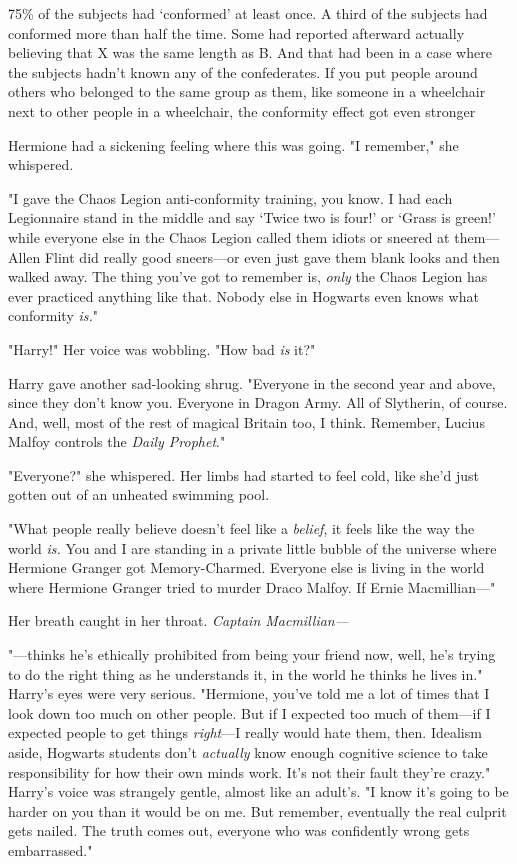 75\% of the subjects had `conformed' at least once. A third of the subjects had
conformed more than half the time. Some had reported afterward actually
believing that X was the same length as B. And that had been in a case where
the subjects hadn't known any of the confederates. If you put people around
others who belonged to the same group as them, like someone in a wheelchair
next to other people in a wheelchair, the conformity effect got even
stronger{\el}

Hermione had a sickening feeling where this was going. "I remember," she
whispered.

"I gave the Chaos Legion anti-conformity training, you know. I had each
Legionnaire stand in the middle and say `Twice two is four!' or `Grass is
green!' while everyone else in the Chaos Legion called them idiots or sneered
at them---Allen Flint did really good sneers---or even just gave them blank
looks and then walked away. The thing you've got to remember is, \emph{only}
the Chaos Legion has ever practiced anything like that. Nobody else in Hogwarts
even knows what conformity \emph{is.}"

"Harry!" Her voice was wobbling. "How bad \emph{is} it?"

Harry gave another sad-looking shrug. "Everyone in the second year and above,
since they don't know you. Everyone in Dragon Army. All of Slytherin, of
course. And, well, most of the rest of magical Britain too, I think. Remember,
Lucius Malfoy controls the \emph{Daily Prophet}."

"Everyone?" she whispered. Her limbs had started to feel cold, like she'd just
gotten out of an unheated swimming pool.

"What people really believe doesn't feel like a \emph{belief}, it feels like
the way the world \emph{is.} You and I are standing in a private little bubble
of the universe where Hermione Granger got Memory-Charmed. Everyone else is
living in the world where Hermione Granger tried to murder Draco Malfoy. If
Ernie Macmillian\mbox{---}"

Her breath caught in her throat. \emph{Captain Macmillian---}

"---thinks he's ethically prohibited from being your friend now, well, he's
trying to do the right thing as he understands it, in the world he thinks he
lives in." Harry's eyes were very serious. "Hermione, you've told me a lot of
times that I look down too much on other people. But if I expected too much of
them---if I expected people to get things \emph{right}---I really would hate
them, then. Idealism aside, Hogwarts students don't \emph{actually} know enough
cognitive science to take responsibility for how their own minds work. It's not
their fault they're crazy." Harry's voice was strangely gentle, almost like an
adult's. "I know it's going to be harder on you than it would be on me. But
remember, eventually the real culprit gets nailed. The truth comes out,
everyone who was confidently wrong gets embarrassed."

